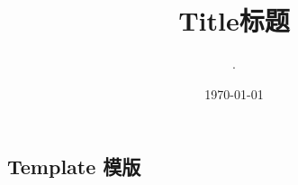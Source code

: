 \documentclass{article}
\begin{document}
\begin{CJK}{UTF8}{gbsn}

\title{Title标题}
\date{\today}
\author{.}
\maketitle


\section{Template 模版}




\end{CJK}
\end{document}
